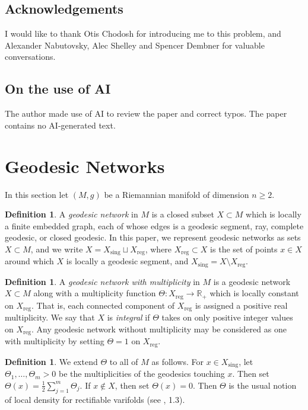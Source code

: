 \documentclass[11pt,reqno,twoside]{amsart}
\newcommand{\reg}{\mathrm{reg}}
\newcommand{\sing}{\mathrm{sing}}
\theoremstyle{definition}
\newtheorem{definition}[lemma]{Definition}
\begin{document}
\subsection{Acknowledgements} I would like to thank Otis Chodosh for introducing me to this problem, and Alexander Nabutovsky, Alec Shelley and Spencer Dembner for valuable conversations.

\subsection{On the use of AI} The author made use of AI to review the paper and correct typos. The paper contains no AI-generated text.



\section{Geodesic Networks}
\label{sec:geodesicnetworks}

In this section let $(M,g)$ be a Riemannian manifold of dimension $n \geq 2$.

\begin{definition}
    A \emph{geodesic network} in $M$ is a closed subset $X \subset M$ which is locally a finite embedded graph, each of whose edges is a geodesic segment, ray, complete geodesic, or closed geodesic. In this paper, we represent geodesic networks as sets $X \subset M$, and we write $X = X_\sing \sqcup X_\reg$, where $X_\reg \subset X$ is the set of points $x \in X$ around which $X$ is locally a geodesic segment, and $X_\sing = X \setminus X_\reg.$
\end{definition}

\begin{definition}
    A \emph{geodesic network with multiplicity} in $M$ is a geodesic network $X \subset M$ along with a multiplicity function $\Theta: X_\reg \to \mathbb{R}_+$ which is locally constant on $X_\reg.$ That is, each connected component of $X_\reg$ is assigned a positive real multiplicity. We say that $X$ is \emph{integral} if $\Theta$ takes on only positive integer values on $X_\reg$. Any geodesic network without multiplicity may be considered as one with multiplicity by setting $\Theta = 1$ on $X_\reg$.
\end{definition}


\begin{definition}
We extend $\Theta$ to all of $M$ as follows. For $x \in X_\sing$, let $\Theta_1, \ldots, \Theta_m > 0$ be the multiplicities of the geodesics touching $x$. Then set $\Theta(x) = \frac{1}{2}\sum_{j=1}^m \Theta_j$. If $x \notin X$, then set $\Theta(x) = 0$. Then $\Theta$ is the usual notion of local density for rectifiable varifolds (see \cite{simon_gmt}, 1.3).
\end{definition}
\end{document}
